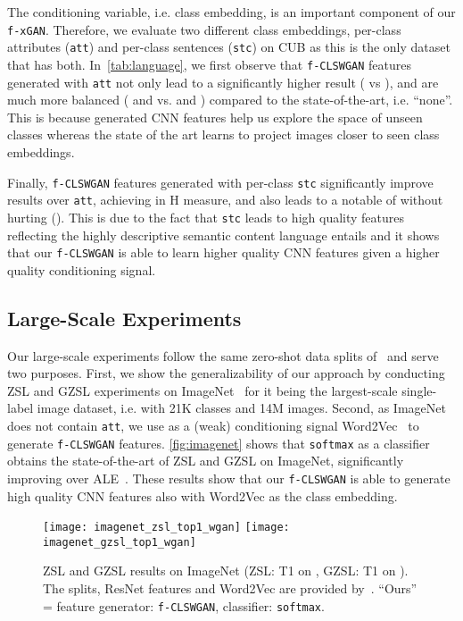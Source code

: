 \documentclass[10pt,twocolumn,letterpaper]{article}
\newcommand{\myparagraph}[1]{\vspace{6pt}\noindent{\bf #1}}
\def\mthd{\texttt{f-xGAN}\xspace}
\begin{document}
\myparagraph{Effect of Class Embeddings.} The conditioning variable, i.e. class embedding, is an important component of our \mthd. Therefore, we evaluate two different class embeddings, per-class attributes (\texttt{att}) and per-class sentences (\texttt{stc}) on CUB as this is the only dataset that has both. In~\autoref{tab:language}, we first observe that \texttt{f-CLSWGAN} features generated with \texttt{att} not only lead to a significantly higher result ( vs ),   and  are much more balanced ( and  vs.  and ) compared to the state-of-the-art, i.e. ``none''. This is because generated CNN features help us explore the space of unseen classes whereas the state of the art learns to project images closer to seen class embeddings.

Finally, \texttt{f-CLSWGAN} features generated with per-class \texttt{stc} significantly improve results over \texttt{att}, achieving  in H measure,
and also leads to a notable  of  without hurting  ().
This is due to the fact that \texttt{stc} leads to high quality features~\cite{RALS16} reflecting the highly descriptive semantic content language entails and it shows that our \texttt{f-CLSWGAN} is able to learn higher quality CNN features given a higher quality conditioning signal.






\subsection{Large-Scale Experiments}
Our large-scale experiments follow the same zero-shot data splits of~\cite{XSA17} and serve two purposes.
First, we show the generalizability of our approach by conducting ZSL and GZSL experiments on ImageNet~\cite{ImageNet} for it being the largest-scale single-label image dataset, i.e. with 21K classes and 14M images. Second, as ImageNet does not contain \texttt{att}, we use as a (weak) conditioning signal Word2Vec~\cite{MSCCD13} to generate \texttt{f-CLSWGAN} features. \autoref{fig:imagenet} shows that \texttt{softmax} as a classifier obtains the state-of-the-art of ZSL and GZSL on ImageNet, significantly improving over ALE~\cite{APHS15}. These results show that our \texttt{f-CLSWGAN} is able to generate high quality CNN features also with Word2Vec as the class embedding. 

\begin{figure}[t]
	\centering
		\texttt{[image: imagenet\_zsl\_top1\_wgan]}
        \texttt{[image: imagenet\_gzsl\_top1\_wgan]}
	\caption{ZSL and GZSL results on ImageNet (ZSL: T1 on , GZSL: T1 on ). The splits, ResNet features and Word2Vec are provided by~\cite{XSA17}. ``Ours'' = feature generator: \texttt{f-CLSWGAN}, classifier: \texttt{softmax}.}
	\label{fig:imagenet}
\end{figure}
\end{document}
